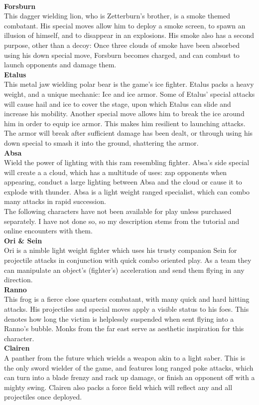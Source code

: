\documentclass{article}
\begin{document}
\\
\textbf{Forsburn}\\
This dagger wielding lion, who is Zetterburn's brother, is a smoke themed combatant. His special moves allow him to deploy a smoke screen, to spawn an illusion of himself, and to disappear in an explosions. His smoke also has a second purpose, other than a decoy: Once three clouds of smoke have been absorbed using his down special move, Forsburn becomes charged, and can combust to launch opponents and damage them.
\\
\textbf{Etalus}\\
This metal jaw wielding polar bear is the game's ice fighter. Etalus packs a heavy weight, and a unique mechanic: Ice and ice armor. Some of Etalus' special attacks will cause hail and ice to cover the stage, upon which Etalus can slide and increase his mobility. Another special move allows him to break the ice around him in order to equip ice armor. This makes him resilient to launching attacks. The armor will break after sufficient damage has been dealt, or through using his down special to smash it into the ground, shattering the armor.
\\
\textbf{Absa}\\
Wield the power of lighting with this ram resembling fighter. Absa's side special will create a a cloud, which has a multitude of uses: zap opponents when appearing, conduct a large lighting between Absa and the cloud or cause it to explode with thunder. Absa is a light weight ranged specialist, which can combo many attacks in rapid succession.\\

The following characters have not been available for play unless purchased separately. I have not done so, so my description stems from the tutorial and online encounters with them.\\

\textbf{Ori \& Sein}\\
Ori is a nimble light weight fighter which uses his trusty companion Sein for projectile attacks in conjunction with quick combo oriented play. As a team they can manipulate an object's (fighter's) acceleration and send them flying in any direction.\\
\textbf{Ranno}\\
This frog is a fierce close quarters combatant, with many quick and hard hitting attacks. His projectiles and special moves apply a visible status to his foes. This denotes how long the victim is helplessly suspended when sent flying into a Ranno's bubble. Monks from the far east serve as aesthetic inspiration for this character.
\\
\textbf{Clairen}\\
A panther from the future which wields a weapon akin to a light saber. This is the only sword wielder of the game, and features long ranged poke attacks, which can turn into a blade frenzy and rack up damage, or finish an opponent off with a mighty swing. Clairen also packs a force field which will reflect any and all projectiles once deployed.\\
\end{document}
